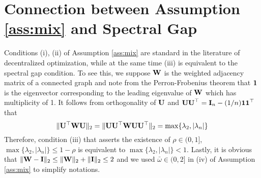 \documentclass[10pt]{article} %
\newcommand{\revision}{}
\theoremstyle{plain}
\theoremstyle{definition}
\theoremstyle{remark}
\begin{document}
\section{Connection between Assumption \ref{ass:mix} and Spectral Gap} \label{app:spectralgap}
{\revision
Conditions (i), (ii) of Assumption \ref{ass:mix} are standard in the literature of decentralized optimization, while at the same time (iii) is equivalent to the spectral gap condition. To see this, we suppose ${\bf W}$ is the weighted adjacency matrix of a connected graph and note from the Perron-Frobenius theorem that ${\bf 1}$ is the eigenvector corresponding to the leading eigenvalue of ${\bf W}$ which has multiplicity of 1. It follows from orthogonality of ${\bf U}$ and ${\bf UU}^\top = {\bf I}_n - (1/n) {\bf 11}^\top$ that 
\begin{equation}
    \|{\bf U^\top W U} \|_2 = \|{\bf UU^\top WUU^\top} \|_2 = \max\{\lambda_2, |\lambda_n| \}
\end{equation}
Therefore, condition (iii) that asserts the existence of $\rho \in (0,1]$, $\max\{ \lambda_2, |\lambda_n| \} \leq 1 - \rho$ is equivalent to $\max\{ \lambda_2, |\lambda_n| \} < 1$. 
Lastly, it is obvious that $\| {\bf W} - {\bf I} \|_2 \leq \| {\bf W} \|_2 + \| {\bf I} \|_2 \leq 2$ and we used $\bar{\omega} \in (0,2]$ in (iv) of Assumption \ref{ass:mix} to simplify notations.
}
\end{document}
